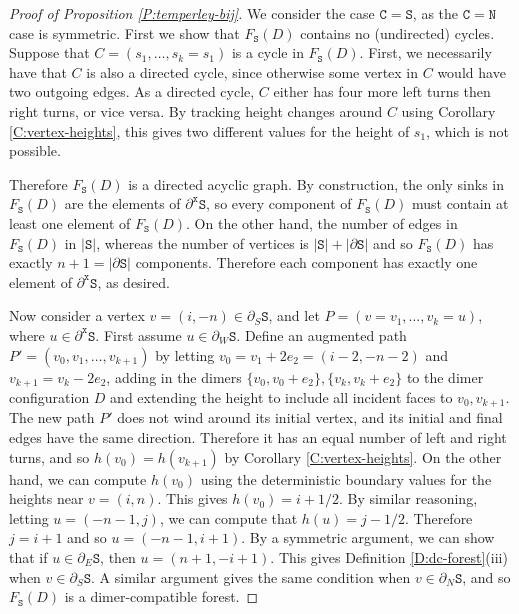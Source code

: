 \documentclass[11pt,twoside]{amsart}
\theoremstyle{plain}
\numberwithin{quest}{section}
\theoremstyle{remark}
\numberwithin{rem}{section}
\theoremstyle{definition}
\renewcommand{\tt}[1]{{\mathtt{#1}}}
\begin{document}
	\begin{proof}[Proof of Proposition \ref{P:temperley-bij}]
		We consider the case $\tt{C} = \tt{S}$, as the $\tt{C} = \tt{N}$ case is symmetric.
		First we show that $F_{\tt{S}}(D)$ contains no (undirected) cycles.
		Suppose that $C = (s_1, \dots, s_k = s_1)$ is a cycle in $F_{\tt{S}}(D)$. First, we necessarily have that $C$ is also a directed cycle, since otherwise some vertex in $C$ would have two outgoing edges. As a directed cycle, $C$ either has four more left turns then right turns, or vice versa. By tracking height changes around $C$ using Corollary \ref{C:vertex-heights}, this gives two different values for the height of $s_1$, which is not possible.
		
		Therefore $F_{\tt{S}}(D)$ is a directed acyclic graph. By construction, the only sinks in $F_{\tt{S}}(D)$ are the elements of $\partial^\tt{x} \tt{S}$, so every component of $F_{\tt{S}}(D)$ must contain at least one element of $F_{\tt{S}}(D)$. On the other hand, the number of edges in $F_{\tt{S}}(D)$ in $|\tt{S}|$, whereas the number of vertices is $|\tt{S}| + |\partial \tt{S}|$ and so $F_{\tt{S}}(D)$ has exactly $n+1 = |\partial \tt{S}|$ components. Therefore each component has exactly one element of $\partial^\tt{x} \tt{S}$, as desired.
		
		Now consider a vertex $v = (i, -n) \in \partial_S \tt{S}$, and let $P = (v = v_1, \dots, v_k = u)$, where $u \in \partial^\tt{x} \tt{S}$. First assume $u \in \partial_W \tt{S}$. Define an augmented path $P' = (v_0, v_1, \dots, v_{k+1})$ by letting $v_0 = v_1 + 2e_2 = (i - 2, -n - 2)$ and $v_{k+1} = v_k - 2e_2$, adding in the dimers $\{v_0, v_0 + e_2\}, \{v_k, v_k + e_2\}$ to the dimer configuration $D$ and extending the height to include all incident faces to $v_0, v_{k+1}$. The new path $P'$ does not wind around its initial vertex, and its initial and final edges have the same direction. Therefore it has an equal number of left and right turns, and so $h(v_0) = h(v_{k+1})$ by Corollary \ref{C:vertex-heights}. On the other hand, we can compute $h(v_0)$ using the deterministic boundary values for the heights near $v = (i, n)$. This gives $h(v_0) = i + 1/2$. By similar reasoning, letting $u = (-n-1, j)$, we can compute that $h(u) = j - 1/2$. Therefore $j = i + 1$ and so $u = (-n- 1, i + 1)$. By a symmetric argument, we can show that if $u \in \partial_E \tt{S}$, then $u = (n+1, -i + 1)$. This gives Definition \ref{D:dc-forest}(iii) when $v \in \partial_S \tt{S}$. A similar argument gives the same condition when $v \in \partial_N \tt{S}$, and so $F_\tt{S}(D)$ is a dimer-compatible forest.
		

\end{proof}
\end{document}

